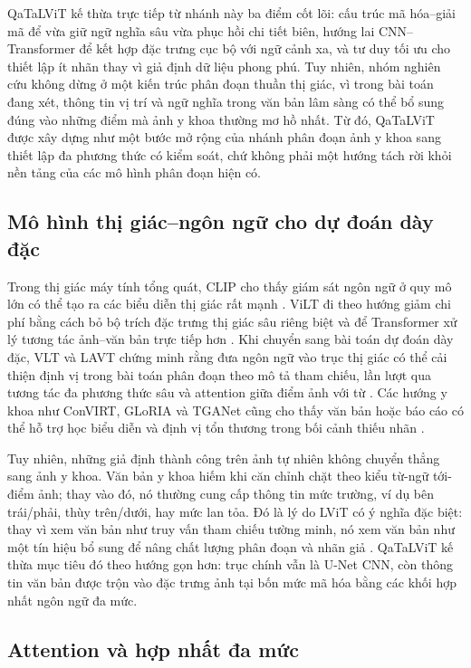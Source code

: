 QaTaLViT kế thừa trực tiếp từ nhánh này ba điểm cốt lõi: cấu trúc mã hóa--giải mã để vừa giữ ngữ nghĩa sâu vừa phục hồi chi tiết biên, hướng lai CNN--Transformer để kết hợp đặc trưng cục bộ với ngữ cảnh xa, và tư duy tối ưu cho thiết lập ít nhãn thay vì giả định dữ liệu phong phú. Tuy nhiên, nhóm nghiên cứu không dừng ở một kiến trúc phân đoạn thuần thị giác, vì trong bài toán đang xét, thông tin vị trí và ngữ nghĩa trong văn bản lâm sàng có thể bổ sung đúng vào những điểm mà ảnh y khoa thường mơ hồ nhất. Từ đó, QaTaLViT được xây dựng như một bước mở rộng của nhánh phân đoạn ảnh y khoa sang thiết lập đa phương thức có kiểm soát, chứ không phải một hướng tách rời khỏi nền tảng của các mô hình phân đoạn hiện có.

\subsection{Mô hình thị giác--ngôn ngữ cho dự đoán dày đặc}

Trong thị giác máy tính tổng quát, CLIP cho thấy giám sát ngôn ngữ ở quy mô lớn có thể tạo ra các biểu diễn thị giác rất mạnh \cite{radford2021clip}. ViLT đi theo hướng giảm chi phí bằng cách bỏ bộ trích đặc trưng thị giác sâu riêng biệt và để Transformer xử lý tương tác ảnh--văn bản trực tiếp hơn \cite{kim2021vilt}. Khi chuyển sang bài toán dự đoán dày đặc, VLT và LAVT chứng minh rằng đưa ngôn ngữ vào trục thị giác có thể cải thiện định vị trong bài toán phân đoạn theo mô tả tham chiếu, lần lượt qua tương tác đa phương thức sâu và attention giữa điểm ảnh với từ \cite{ding2021vlt,yang2022lavt}. Các hướng y khoa như ConVIRT, GLoRIA và TGANet cũng cho thấy văn bản hoặc báo cáo có thể hỗ trợ học biểu diễn và định vị tổn thương trong bối cảnh thiếu nhãn \cite{zhang2020convirt,huang2021gloria,tomar2022tganet}.

Tuy nhiên, những giả định thành công trên ảnh tự nhiên không chuyển thẳng sang ảnh y khoa. Văn bản y khoa hiếm khi căn chỉnh chặt theo kiểu từ-ngữ tới-điểm ảnh; thay vào đó, nó thường cung cấp thông tin mức trường, ví dụ bên trái/phải, thùy trên/dưới, hay mức lan tỏa. Đó là lý do LViT có ý nghĩa đặc biệt: thay vì xem văn bản như truy vấn tham chiếu tường minh, nó xem văn bản như một tín hiệu bổ sung để nâng chất lượng phân đoạn và nhãn giả \cite{li2023lvit}. QaTaLViT kế thừa mục tiêu đó theo hướng gọn hơn: trục chính vẫn là U-Net CNN, còn thông tin văn bản được trộn vào đặc trưng ảnh tại bốn mức mã hóa bằng các khối hợp nhất ngôn ngữ đa mức.

\subsection{Attention và hợp nhất đa mức}

